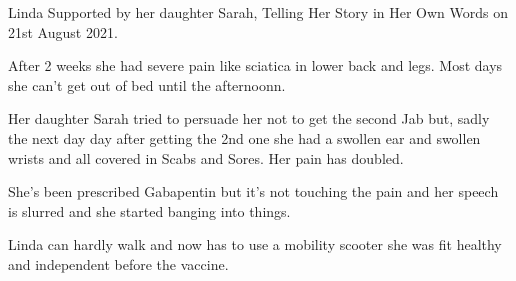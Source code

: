Linda Supported by her daughter Sarah, Telling Her Story in Her Own Words on
21st August 2021.

After 2 weeks she had severe pain like sciatica in lower back and legs. Most
days she can’t get out of bed until the afternoonn.

Her daughter Sarah tried to persuade her not to get the second Jab but, sadly
the next day day after getting the 2nd one she had a swollen ear and swollen
wrists and all covered in Scabs and Sores. Her pain has doubled.

She’s been prescribed Gabapentin but it’s not touching the pain and her speech
is slurred and she started banging into things.

Linda can hardly walk and now has to use a mobility scooter she was fit healthy
and independent before the vaccine.

